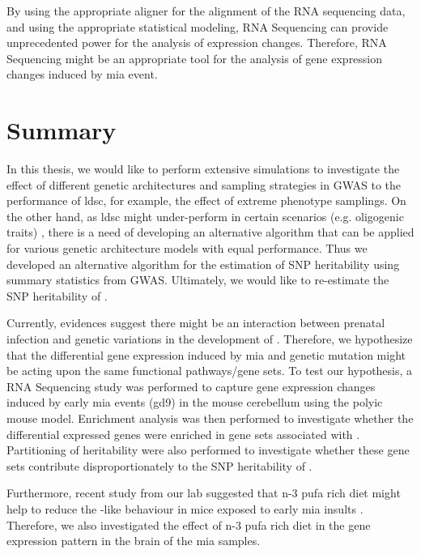 	By using the appropriate aligner for the alignment of the RNA sequencing data, and using the appropriate statistical modeling, RNA Sequencing can provide unprecedented power for the analysis of expression changes.
	Therefore, RNA Sequencing might be an appropriate tool for the analysis of gene expression changes induced by \gls{mia} event.
	
	\section{Summary}
	In this thesis, we would like to perform extensive simulations to investigate the effect of different genetic architectures and sampling strategies in \gls{GWAS} to the performance of \gls{ldsc}, for example, the effect of extreme phenotype samplings.
	On the other hand, as \gls{ldsc} might under-perform in certain scenarios (e.g. oligogenic traits) \citep{Bulik-Sullivan2015}, there is a need of developing an alternative algorithm that can be applied for various genetic architecture models with equal performance.
	Thus we developed an alternative algorithm for the estimation of \gls{SNP} heritability using summary statistics from \gls{GWAS}.
	Ultimately, we would like to re-estimate the \gls{SNP} heritability of .

	Currently, evidences suggest there might be an interaction between prenatal infection and genetic variations in the development of  \citep{Tienari2004,Clarke2009}.
	Therefore, we hypothesize that the differential gene expression induced by \gls{mia} and genetic mutation might be acting upon the same functional pathways/gene sets.
	To test our hypothesis, a RNA Sequencing study was performed to capture gene expression changes induced by early \gls{mia} events (\gls{gd}9) in the mouse cerebellum using the \gls{polyic} mouse model.
	Enrichment analysis was then performed to investigate whether the differential expressed genes were enriched in gene sets associated with .
	Partitioning of heritability were also performed to investigate whether these gene sets contribute disproportionately to the \gls{SNP} heritability of .
	
	Furthermore, recent study from our lab suggested that n-3 \gls{pufa} rich diet might help to reduce the -like behaviour in mice exposed to early \gls{mia} insults \citep{Li2015}.
	Therefore, we also investigated the effect of n-3 \gls{pufa} rich diet in the gene expression pattern in the brain of the \gls{mia} samples. 
	

